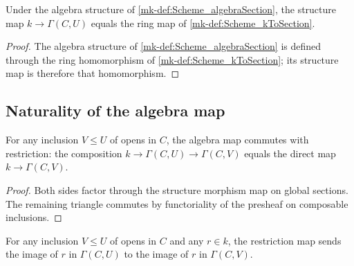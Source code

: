 \begin{lemma}\label{mk-lem:Scheme_algebraMap_eq_kToSection}
  \leanok


  Under the algebra structure of \ref{mk-def:Scheme_algebraSection}, the structure map \(k \to \Gamma(C, U)\) equals the ring map of \ref{mk-def:Scheme_kToSection}.
\end{lemma}

\begin{proof}
  \leanok

  The algebra structure of \ref{mk-def:Scheme_algebraSection} is defined through the ring homomorphism of \ref{mk-def:Scheme_kToSection}; its structure map is therefore that homomorphism.
\end{proof}

\subsection{Naturality of the algebra map}

\begin{lemma}\label{mk-lem:Scheme_kToSection_naturality}
  \leanok


  For any inclusion \(V \le U\) of opens in \(C\), the algebra map commutes with restriction: the composition \(k \to \Gamma(C, U) \to \Gamma(C, V)\) equals the direct map \(k \to \Gamma(C, V)\).
\end{lemma}

\begin{proof}
  \leanok

  Both sides factor through the structure morphism map on global sections. The remaining triangle commutes by functoriality of the presheaf on composable inclusions.
\end{proof}

\begin{lemma}\label{mk-lem:Scheme_algebraMap_naturality}
  \leanok


  For any inclusion \(V \le U\) of opens in \(C\) and any \(r \in k\), the restriction map sends the image of \(r\) in \(\Gamma(C, U)\) to the image of \(r\) in \(\Gamma(C, V)\).
\end{lemma}

